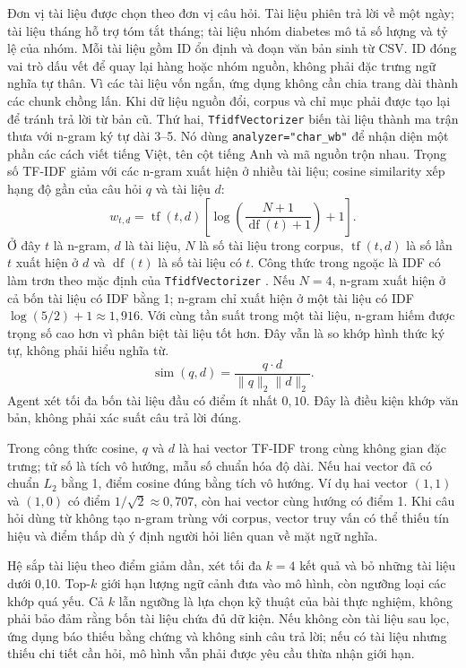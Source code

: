 \documentclass[12pt,a4paper]{report}
\begin{document}
Đơn vị tài liệu được chọn theo đơn vị câu hỏi. Tài liệu phiên trả lời về một ngày; tài liệu tháng hỗ trợ tóm tắt tháng; tài liệu nhóm diabetes mô tả số lượng và tỷ lệ của nhóm. Mỗi tài liệu gồm ID ổn định và đoạn văn bản sinh từ CSV. ID đóng vai trò dấu vết để quay lại hàng hoặc nhóm nguồn, không phải đặc trưng ngữ nghĩa tự thân. Vì các tài liệu vốn ngắn, ứng dụng không cần chia trang dài thành các chunk chồng lấn. Khi dữ liệu nguồn đổi, corpus và chỉ mục phải được tạo lại để tránh trả lời từ bản cũ.
Thứ hai, \texttt{TfidfVectorizer} biến tài liệu thành ma trận thưa với n-gram ký tự dài 3--5.
Nó dùng \texttt{analyzer="char\_wb"} để nhận diện một phần các cách viết tiếng Việt, tên cột
tiếng Anh và mã nguồn trộn nhau. Trọng số TF-IDF giảm với các n-gram xuất hiện ở nhiều tài liệu;
cosine similarity xếp hạng độ gần của câu hỏi $q$ và tài liệu $d$:
\begin{equation}
w_{t,d}=\operatorname{tf}(t,d)\left[\log\!\left(\frac{N+1}{\operatorname{df}(t)+1}\right)+1\right].
\end{equation}
Ở đây $t$ là n-gram, $d$ là tài liệu, $N$ là số tài liệu trong corpus, $\operatorname{tf}(t,d)$ là số lần $t$ xuất hiện ở $d$ và $\operatorname{df}(t)$ là số tài liệu có $t$. Công thức trong ngoặc là IDF có làm trơn theo mặc định của \texttt{TfidfVectorizer} \cite{essay03-sklearn-tfidf}. Nếu $N=4$, n-gram xuất hiện ở cả bốn tài liệu có IDF bằng 1; n-gram chỉ xuất hiện ở một tài liệu có IDF $\log(5/2)+1\approx1{,}916$. Với cùng tần suất trong một tài liệu, n-gram hiếm được trọng số cao hơn vì phân biệt tài liệu tốt hơn. Đây vẫn là so khớp hình thức ký tự, không phải hiểu nghĩa từ.
\begin{equation}
\operatorname{sim}(q,d)=\frac{q\cdot d}{\lVert q\rVert_2\lVert d\rVert_2}.
\end{equation}
Agent xét tối đa bốn tài liệu đầu có điểm ít nhất $0{,}10$. Đây là điều kiện khớp văn bản, không
phải xác suất câu trả lời đúng.

Trong công thức cosine, $q$ và $d$ là hai vector TF-IDF trong cùng không gian đặc trưng; tử số là tích vô hướng, mẫu số chuẩn hóa độ dài. Nếu hai vector đã có chuẩn $L_2$ bằng 1, điểm cosine đúng bằng tích vô hướng. Ví dụ hai vector $(1,1)$ và $(1,0)$ có điểm $1/\sqrt2\approx0{,}707$, còn hai vector cùng hướng có điểm 1. Khi câu hỏi dùng từ không tạo n-gram trùng với corpus, vector truy vấn có thể thiếu tín hiệu và điểm thấp dù ý định người hỏi liên quan về mặt ngữ nghĩa.

Hệ sắp tài liệu theo điểm giảm dần, xét tối đa $k=4$ kết quả và bỏ những tài liệu dưới 0,10. Top-$k$ giới hạn lượng ngữ cảnh đưa vào mô hình, còn ngưỡng loại các khớp quá yếu. Cả $k$ lẫn ngưỡng là lựa chọn kỹ thuật của bài thực nghiệm, không phải bảo đảm rằng bốn tài liệu chứa đủ dữ kiện. Nếu không còn tài liệu sau lọc, ứng dụng báo thiếu bằng chứng và không sinh câu trả lời; nếu có tài liệu nhưng thiếu chi tiết cần hỏi, mô hình vẫn phải được yêu cầu thừa nhận giới hạn.
\end{document}
